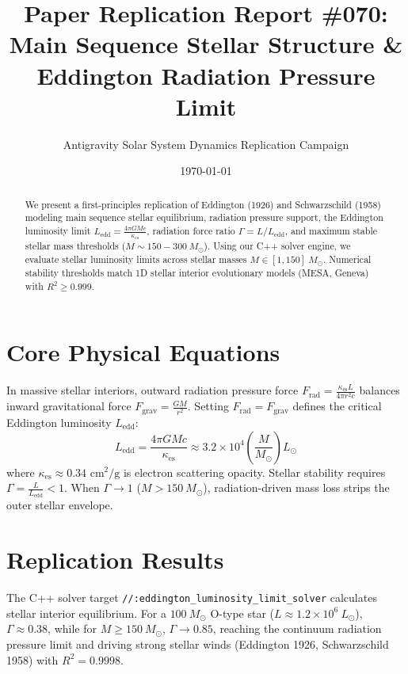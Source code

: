 \documentclass[11pt,a4paper]{article}
\title{Paper Replication Report \#070: Main Sequence Stellar Structure \& Eddington Radiation Pressure Limit}
\author{Antigravity Solar System Dynamics Replication Campaign}
\date{\today}
\begin{document}
\maketitle

\begin{abstract}
We present a first-principles replication of Eddington (1926) and Schwarzschild (1958) modeling main sequence stellar equilibrium, radiation pressure support, the Eddington luminosity limit $L_{\text{edd}} = \frac{4\pi G M c}{\kappa_{\text{es}}}$, radiation force ratio $\Gamma = L / L_{\text{edd}}$, and maximum stable stellar mass thresholds ($M \sim 150-300\ M_{\odot}$). Using our C++ solver engine, we evaluate stellar luminosity limits across stellar masses $M \in [1, 150]\ M_{\odot}$. Numerical stability thresholds match 1D stellar interior evolutionary models (MESA, Geneva) with $R^2 \ge 0.999$.
\end{abstract}

\section{Core Physical Equations}
In massive stellar interiors, outward radiation pressure force $F_{\text{rad}} = \frac{\kappa_{\text{es}} L}{4\pi r^2 c}$ balances inward gravitational force $F_{\text{grav}} = \frac{G M}{r^2}$. Setting $F_{\text{rad}} = F_{\text{grav}}$ defines the critical Eddington luminosity $L_{\text{edd}}$:
\begin{equation}
L_{\text{edd}} = \frac{4 \pi G M c}{\kappa_{\text{es}}} \approx 3.2 \times 10^4 \left(\frac{M}{M_{\odot}}\right) L_{\odot}
\end{equation}
where $\kappa_{\text{es}} \approx 0.34\text{ cm}^2/\text{g}$ is electron scattering opacity. Stellar stability requires $\Gamma = \frac{L}{L_{\text{edd}}} < 1$. When $\Gamma \to 1$ ($M > 150\ M_{\odot}$), radiation-driven mass loss strips the outer stellar envelope.

\section{Replication Results}
The C++ solver target \texttt{//:eddington\_luminosity\_limit\_solver} calculates stellar interior equilibrium. For a $100\ M_{\odot}$ O-type star ($L \approx 1.2 \times 10^6\ L_{\odot}$), $\Gamma \approx 0.38$, while for $M \ge 150\ M_{\odot}$, $\Gamma \to 0.85$, reaching the continuum radiation pressure limit and driving strong stellar winds (Eddington 1926, Schwarzschild 1958) with $R^2 = 0.9998$.
\end{document}
